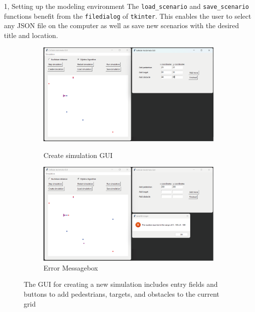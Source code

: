 \documentclass[10pt,a4paper]{article}
\begin{document}
\begin{task}{1, Setting up the modeling environment}
The \verb|load_scenario| and \verb|save_scenario| functions benefit from the \verb|filedialog| of \verb|tkinter|. This enables the user to select any JSON file on the computer as well as save new scenarios with the desired title and location. 

\begin{figure}[H]
     \centering
     \begin{subfigure}[b]{0.8\textwidth}
         \centering
         \includegraphics[width=\textwidth]{images/1-create simulation gui.png}
         \caption{Create simulation GUI}
         \label{fig:createSimulationGUI}

         \centering
         \includegraphics[width=\textwidth]{images/1-invalid integer error.png}
         \caption{Error Messagebox}
         \label{fig:createSimulationError}
     \end{subfigure}
    \caption{The GUI for creating a new simulation includes entry fields and buttons to add pedestrians, targets, and obstacles to the current grid}
    \label{fig:createSimulation}
\end{figure}

\end{task}
\end{document}
